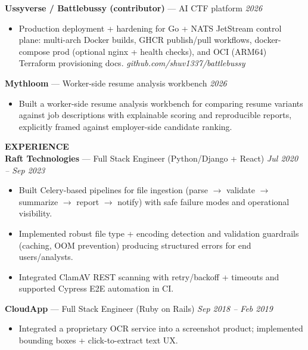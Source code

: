 \documentclass[10pt]{article}
\begin{document}
\textbf{Ussyverse / Battlebussy (contributor)} --- AI CTF platform \hfill \textit{2026}\\
\vspace{-6pt}
\begin{itemize}
  \setlength\itemsep{-2pt}
  \setlength\parskip{0pt}
  \setlength\parsep{0pt}
  \item Production deployment + hardening for Go + NATS JetStream control plane: multi-arch Docker builds, GHCR publish/pull workflows, docker-compose prod (optional nginx + health checks), and OCI (ARM64) Terraform provisioning docs. \textit{github.com/shuv1337/battlebussy}
\end{itemize}

\textbf{Mythloom} --- Worker-side resume analysis workbench \hfill \textit{2026}\\
\vspace{-6pt}
\begin{itemize}
  \setlength\itemsep{-2pt}
  \setlength\parskip{0pt}
  \setlength\parsep{0pt}
  \item Built a worker-side resume analysis workbench for comparing resume variants against job descriptions with explainable scoring and reproducible reports, explicitly framed against employer-side candidate ranking.
\end{itemize}

\vspace{6pt}
\textbf{EXPERIENCE}\\

\textbf{Raft Technologies} --- Full Stack Engineer (Python/Django + React) \hfill \textit{Jul 2020 -- Sep 2023}\\
\vspace{-6pt}
\begin{itemize}
  \setlength\itemsep{-2pt}
  \setlength\parskip{0pt}
  \setlength\parsep{0pt}
  \item Built Celery-based pipelines for file ingestion (parse $\rightarrow$ validate $\rightarrow$ summarize $\rightarrow$ report $\rightarrow$ notify) with safe failure modes and operational visibility.
  \item Implemented robust file type + encoding detection and validation guardrails (caching, OOM prevention) producing structured errors for end users/analysts.
  \item Integrated ClamAV REST scanning with retry/backoff + timeouts and supported Cypress E2E automation in CI.
\end{itemize}

\textbf{CloudApp} --- Full Stack Engineer (Ruby on Rails) \hfill \textit{Sep 2018 -- Feb 2019}\\
\vspace{-6pt}
\begin{itemize}
  \setlength\itemsep{-2pt}
  \setlength\parskip{0pt}
  \setlength\parsep{0pt}
  \item Integrated a proprietary OCR service into a screenshot product; implemented bounding boxes + click-to-extract text UX.
\end{itemize}
\end{document}

